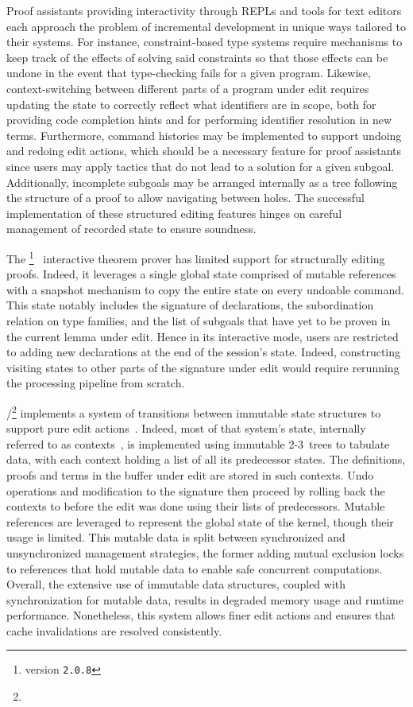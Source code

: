 Proof assistants providing interactivity through \acp{REPL} and tools for text editors each approach the problem of incremental development in unique ways tailored to their systems.
For instance, constraint-based type systems require mechanisms to keep track of the effects of solving said constraints so that those effects can be undone in the event that type-checking fails for a given program.
Likewise, context-switching between different parts of a program under edit requires updating the state to correctly reflect what identifiers are in scope, both for providing code completion hints and for performing identifier resolution in new terms.
Furthermore, command histories may be implemented to support undoing and redoing edit actions, which should be a necessary feature for proof assistants since users may apply tactics that do not lead to a solution for a given subgoal.
Additionally, incomplete subgoals may be arranged internally as a tree following the structure of a proof to allow navigating between holes.
The successful implementation of these structured editing features hinges on careful management of recorded state to ensure soundness.

The \Abella\footnote{\Abella version \texttt{2.0.8}}~\cite{baelde2014abella} interactive theorem prover has limited support for structurally editing proofs.
Indeed, it leverages a single global state comprised of mutable references with a snapshot mechanism to copy the entire state on every undoable command.
This state notably includes the signature of declarations, the subordination relation on type families, and the list of subgoals that have yet to be proven in the current lemma under edit.
Hence in its interactive mode, \Abella users are restricted to adding new declarations at the end of the session's state.
Indeed, constructing visiting states to other parts of the signature under edit would require rerunning the processing pipeline from scratch.

\Isabelle/\Isar\footnote{} implements a system of transitions between immutable state structures to support pure edit actions~\cite{wenzel2023isabelleimpl, wenzel2023isabelleisarref, wenzel2023isabellesys}.
Indeed, most of that system's state, internally referred to as contexts~\cite{ballarin2006interpretation}, is implemented using immutable 2-3~trees to tabulate data, with each context holding a list of all its predecessor states.
The definitions, proofs and terms in the buffer under edit are stored in such contexts.
Undo operations and modification to the signature then proceed by rolling back the contexts to before the edit was done using their lists of predecessors.
Mutable references are leveraged to represent the global state of the kernel, though their usage is limited.
This mutable data is split between synchronized and unsynchronized management strategies, the former adding mutual exclusion locks to references that hold mutable data to enable safe concurrent computations.
Overall, the extensive use of immutable data structures, coupled with synchronization for mutable data, results in degraded memory usage and runtime performance.
Nonetheless, this system allows finer edit actions and ensures that cache invalidations are resolved consistently.

